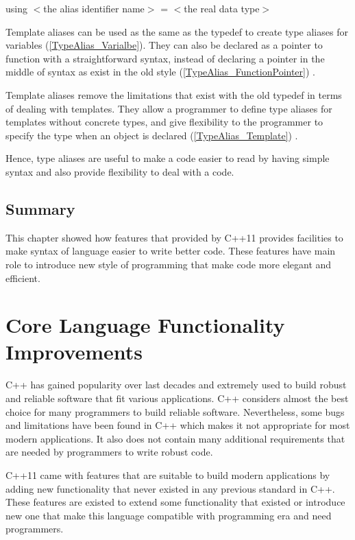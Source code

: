 \documentclass[11pt]{report}
\begin{document}
\begin{center}
using $<$the alias identifier name$>$ = $<$the real data type$>$
\end{center}

Template aliases can be used as the same as the typedef to create type aliases for variables (\ref{TypeAlias_Varialbe}). They can also be declared as a pointer to function with a straightforward syntax, instead of declaring a pointer in the middle of syntax as exist in the old style (\ref{TypeAlias_FunctionPointer}) \cite{Gregorie:professionalcpp}.


Template aliases remove the limitations that exist with the old typedef in terms of dealing with templates. They allow a programmer to define type aliases for templates without concrete types, and give flexibility to the programmer to specify the type when an object is declared (\ref{TypeAlias_Template}) \cite{Gregorie:professionalcpp}.


Hence, type aliases are useful to make a code easier to read by having simple syntax and also provide flexibility to deal with a code.

\section{Summary}
\label{sect: Summary}
This chapter showed how features that provided by C++11 provides facilities to make syntax of language easier to write better code.  These features have main role to introduce new style of programming that make code more elegant and efficient.

\chapter{Core Language Functionality Improvements}
\label{chapter: Functionality Improvements}
C++ has gained popularity over last decades and extremely used to build robust and reliable software that fit various applications.  C++ considers almost the best choice for many programmers to build reliable software. Nevertheless, some bugs and limitations have been found in C++ which makes it not appropriate for most modern applications. It also does not contain many additional requirements that are needed by programmers to write robust code.

C++11 came with features that are suitable to build modern applications by adding new functionality that never existed in any previous standard in C++. These features are existed to extend some functionality that existed or introduce new one that make this language compatible with programming era and need programmers.
\end{document}
